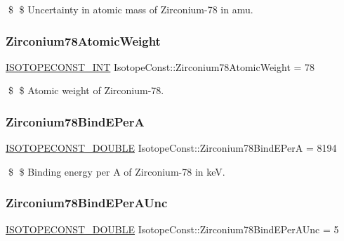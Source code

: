 \$ \$ Uncertainty in atomic mass of Zirconium-\/78 in amu. \mbox{\label{group___isotope_const-_zirconium-_zr78_gab5b3b448cd6bdaece222e007bcc90597}} 
\subsubsection{\texorpdfstring{Zirconium78\+Atomic\+Weight}{Zirconium78AtomicWeight}}
{\footnotesize\ttfamily \mbox{\hyperlink{group___isotope_const-_macros_ga5f18360b3e99483a35c32d789e62621c}{I\+S\+O\+T\+O\+P\+E\+C\+O\+N\+S\+T\+\_\+\+I\+NT}} Isotope\+Const\+::\+Zirconium78\+Atomic\+Weight = 78}

\$ \$ Atomic weight of Zirconium-\/78. \mbox{\label{group___isotope_const-_zirconium-_zr78_ga49aaab1ff9fda666dc3e090dd4aa12e7}} 
\subsubsection{\texorpdfstring{Zirconium78\+Bind\+E\+PerA}{Zirconium78BindEPerA}}
{\footnotesize\ttfamily \mbox{\hyperlink{group___isotope_const-_macros_ga8f45a7272ce02c0b4c65c44636ed719a}{I\+S\+O\+T\+O\+P\+E\+C\+O\+N\+S\+T\+\_\+\+D\+O\+U\+B\+LE}} Isotope\+Const\+::\+Zirconium78\+Bind\+E\+PerA = 8194}

\$ \$ Binding energy per A of Zirconium-\/78 in keV. \mbox{\label{group___isotope_const-_zirconium-_zr78_gaa4cd1f6d2b85875c097f8dc63d82ee9d}} 
\subsubsection{\texorpdfstring{Zirconium78\+Bind\+E\+Per\+A\+Unc}{Zirconium78BindEPerAUnc}}
{\footnotesize\ttfamily \mbox{\hyperlink{group___isotope_const-_macros_ga8f45a7272ce02c0b4c65c44636ed719a}{I\+S\+O\+T\+O\+P\+E\+C\+O\+N\+S\+T\+\_\+\+D\+O\+U\+B\+LE}} Isotope\+Const\+::\+Zirconium78\+Bind\+E\+Per\+A\+Unc = 5}

